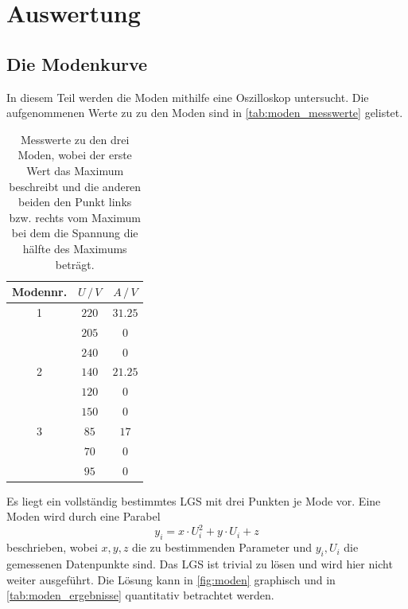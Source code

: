 \section{Auswertung}
\label{sec:Auswertung}

\subsection{Die Modenkurve}
In diesem Teil werden die Moden mithilfe eine Oszilloskop untersucht.
Die aufgenommenen Werte zu zu den Moden sind in \autoref{tab:moden_messwerte} gelistet.
\begin{table}
    \centering
    \caption{Messwerte zu den drei Moden, wobei der erste Wert das Maximum beschreibt und die anderen beiden den Punkt links bzw. rechts vom Maximum bei dem die Spannung die hälfte des Maximums beträgt.}
    \begin{tabular}{c c c}
        \toprule
        Modennr. & $U \,/\, V$ & $A \,/\, V$ \\
        \midrule
        1 & $220$ & $31.25$ \\
        & $205$ & $0$ \\
        & $240$ & $0$ \\
        \hline
        2 & $140$ & $21.25$ \\
        & $120$ & $0$ \\
        & $150$ & $0$ \\
        \hline
        3 & $85$ & $17$ \\
        & $70$ & $0$ \\
        & $95$ & $0$ \\
        \bottomrule
    \end{tabular}
    \label{tab:moden_messwerte}
\end{table}
\FloatBarrier
Es liegt ein vollständig bestimmtes LGS mit drei Punkten je Mode vor.
Eine Moden wird durch eine Parabel
\begin{equation*}
    y_i = x \cdot U_i^2 + y \cdot U_i + z
\end{equation*}
beschrieben, wobei $x, y, z$ die zu bestimmenden Parameter und $y_i, U_i$ die gemessenen Datenpunkte sind.
Das LGS ist trivial zu lösen und wird hier nicht weiter ausgeführt.
Die Lösung kann in \autoref{fig:moden} graphisch und in \autoref{tab:moden_ergebnisse} quantitativ betrachtet werden.
